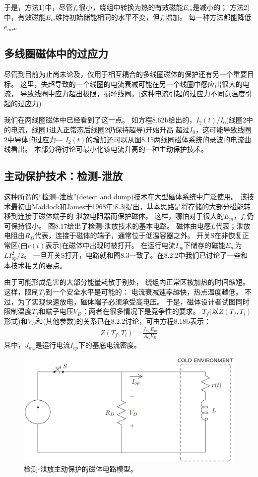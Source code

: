 于是，方法1)中，尽管$f_r$很小，绕组中转换为热的有效磁能$E_m$是减小的；
方法2)中，有效磁能$E_m$维持初始储能相同的水平不变，但$f_r$增加。
每一种方法都能降低$e_{mr}$。

\subsection{多线圈磁体中的过应力}
尽管到目前为止尚未论及，仅用于相互耦合的多线圈磁体的保护还有另一个重要目标。
这里，失超导致的一个线圈的电流衰减可能在另一个线圈中感应出很大的电流，
导致线圈中应力超出极限，损坏线圈。(这种电流引起的过应力不同意温度引起的过应力)

我们在两线圈磁体中已经看到了这一点。
如方程8.62b给出的，$I_2(t)/I_0$(线圈2中的电流，线圈1进入正常态后线圈2仍保持超导)开始升高
超过$I_0$，这可能导致线圈2中导体的过应力---
$I_2(t)$的增加还可以从图8.15两线圈磁体系统的录波的电流曲线看出。
本部分将讨论可最小化该电流升高的一种主动保护技术。

\subsection{主动保护技术：检测-泄放}
这种所谓的“检测--泄放”(detect and dump)技术在大型磁体系统中广泛使用。
该技术最初由Maddock和James于1968年[8.3]提出，基本思路是将存储的大部分磁能转移到连接于磁体端子的
泄放电阻器而保护磁体。
这样，哪怕对于很大的$E_m$，$f_r$仍可保持很小。
图8.17给出了检测-泄放技术的基本电路。
磁体由电感$L$代表；泄放电阻由$R_D$代表，连接于磁体的端子，通常位于低温容器之外。
开关S在非恢复正常区(由$r(t)$表示)在磁体中出现时被打开。
在运行电流$I_{op}$下储存的磁能$E_m$为$LI_{op}^2/2$。
一旦开关S打开，电路就和图8.3一致了。在8.2.2中我们已讨论了一些和本技术相关的要点。

由于可能形成危害的大部分能量耗散于别处，
绕组内正常区被加热的时间缩短。这样，限制$T_f$到一个安全水平是可能的：
电流衰减速率越快，热点温度越低。
不过，为了实现快速放电，磁体端子必须承受高电压。
于是，磁体设计者试图同时限制温度$T_f$和端子电压$V_D$：两者在很多情况下是竞争性的要求。
$T_f$(以$Z(T_f,T_i)$形式)和$V_D$和(其他参数)的关系已在8.2.2讨论，可由方程8.18b表示：
\begin{align*}%
Z(T_f,T_i)=\frac{J_{m_o}E_m}{A_{cd}V_D}\tag{8.18b}
\end{align*}
其中，$J_{m_o}$是运行电流$I_{op}$下的基底电流密度。

\begin{figure}
	\centering
	\includegraphics[scale=0.4]{chpt8/figs/fig8.17.eps}
	\caption{检测-泄放主动保护的磁体电路模型。}
\end{figure}

